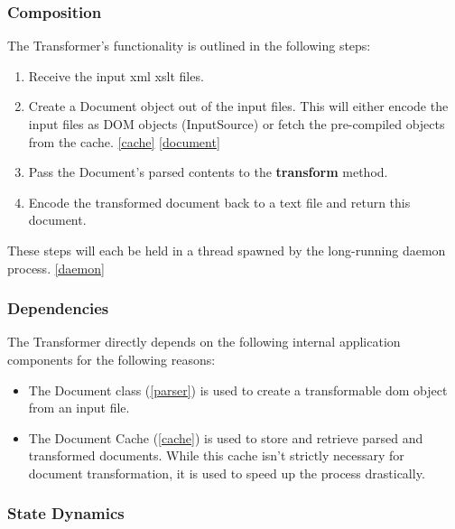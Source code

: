 \subsubsection{Composition}

The Transformer's functionality is outlined in the following steps:

\begin{enumerate}
  \item Receive the input \gls{xml} \gls{xslt} files.
  \item Create a Document object out of the input files. This will either encode the input files as DOM objects (InputSource) or fetch the pre-compiled objects from the cache. \ref{cache} \ref{document}
  \item Pass the Document's parsed contents to the \cite{xalan-library} \textbf{transform} method.
  \item Encode the transformed document back to a text file and return this document.
\end{enumerate}

These steps will each be held in a thread spawned by the long-running daemon process. \ref{daemon}

\subsubsection{Dependencies}

The Transformer directly depends on the following internal application components for the following reasons:

\begin{itemize}
  \item {
      The Document class (\ref{parser}) is used to create a transformable \gls{dom} object from an input file. \cite{dom-spec}
  }
  \item {
    The Document Cache (\ref{cache}) is used to store and retrieve parsed and transformed documents.
    While this cache isn't strictly necessary for document transformation, it is used to speed up the process drastically.
  }
\end{itemize}

\subsubsection{State Dynamics}

